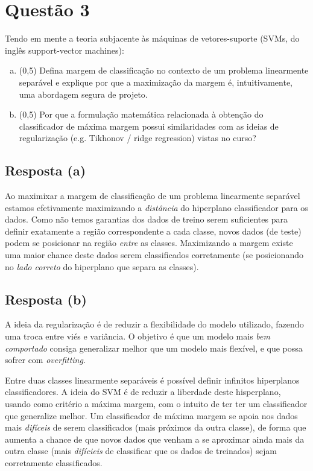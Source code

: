 \documentclass[final,3p]{elsarticle}
\numberwithin{equation}{section}
\begin{document}
\section{Questão 3}

    Tendo em mente a teoria subjacente às máquinas de vetores-suporte (SVMs, do inglês support-vector machines):

    \begin{enumerate}[(a)]
        \item (0,5) Defina margem de classificação no contexto de um problema linearmente separável e explique por que a maximização da margem é, intuitivamente, uma abordagem segura de projeto.
        \item (0,5) Por que a formulação matemática relacionada à obtenção do classificador de máxima margem possui similaridades com as ideias de regularização (e.g. Tikhonov / ridge regression) vistas no curso?
    \end{enumerate}

    \subsection{Resposta \textbf{(a)}}

        Ao maximixar a margem de classificação de um problema linearmente separável estamos efetivamente maximizando a \emph{distância} do hiperplano classificador para os dados. Como não temos garantias dos dados de treino serem suficientes para definir exatamente a região correspondente a cada classe, novos dados (de teste) podem se posicionar na região \emph{entre} as classes. Maximizando a margem existe uma maior chance deste dados serem classificados corretamente (se posicionando no \emph{lado correto} do hiperplano que separa as classes).

    \subsection{Resposta \textbf{(b)}}

        A ideia da regularização é de reduzir a flexibilidade do modelo utilizado, fazendo uma troca entre viés e variância. O objetivo é que um modelo mais \emph{bem comportado} consiga generalizar melhor que um modelo mais flexível, e que possa sofrer com \emph{overfitting}.

        Entre duas classes linearmente separáveis é possível definir infinitos hiperplanos classificadores. A ideia do SVM é de reduzir a liberdade deste hisperplano, usando como critério a máxima margem, com o intuito de ter ter um classificador que generalize melhor. Um classificador de máxima margem se apoia nos dados mais \emph{difíceis} de serem classificados (mais próximos da outra classe), de forma que aumenta a chance de que novos dados que venham a se aproximar ainda mais da outra classe (mais \emph{difícieis} de classificar que os dados de treinados) sejam corretamente classificados.
\end{document}

